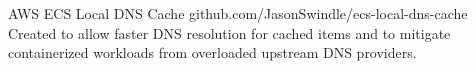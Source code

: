\projectitem
    {AWS ECS Local DNS Cache}
    {github.com/JasonSwindle/ecs-local-dns-cache}
    {Created to allow faster DNS resolution for cached items and to mitigate containerized workloads from overloaded upstream DNS providers.}